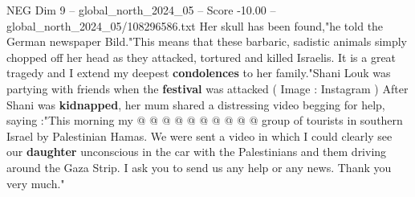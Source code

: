 \begin{textsample}{NEG Dim 9 – global\_north\_2024\_05 – Score -10.00 – global\_north\_2024\_05/108296586.txt}
Her skull has been found,"he told the German newspaper Bild."This means that these barbaric, sadistic animals simply chopped off her head as they attacked, tortured and killed Israelis.
It is a great tragedy and I extend my deepest \textbf{condolences} to her family."Shani Louk was partying with friends when the \textbf{festival} was attacked ( Image : Instagram ) After Shani was \textbf{kidnapped}, her mum shared a distressing video begging for help, saying :"This morning my @ @ @ @ @ @ @ @ @ @ group of tourists in southern Israel by Palestinian Hamas.
We were sent a video in which I could clearly see our \textbf{daughter} unconscious in the car with the Palestinians and them driving around the Gaza Strip.
I ask you to send us any help or any news.
Thank you very much."

\end{textsample}
